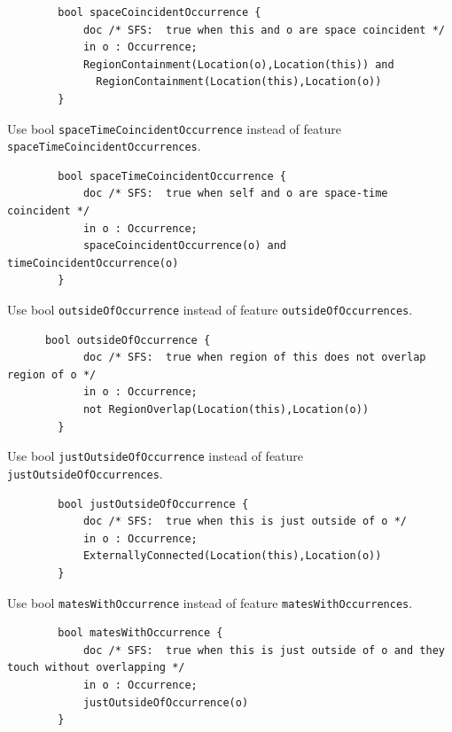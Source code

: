 \begin{lstlisting}
		bool spaceCoincidentOccurrence {
			doc /* SFS:  true when this and o are space coincident */
			in o : Occurrence;
			RegionContainment(Location(o),Location(this)) and
			  RegionContainment(Location(this),Location(o))
		}
\end{lstlisting}

\pn Use bool \texttt{spaceTimeCoincidentOccurrence} instead of feature \texttt{spaceTimeCoincidentOccur\-rences}.

\begin{lstlisting}
		bool spaceTimeCoincidentOccurrence {
			doc /* SFS:  true when self and o are space-time coincident */
			in o : Occurrence;
			spaceCoincidentOccurrence(o) and timeCoincidentOccurrence(o)
		}
\end{lstlisting}

\pn Use bool \texttt{outsideOfOccurrence} instead of feature \texttt{outsideOfOccurrences}.

\begin{lstlisting}
	  bool outsideOfOccurrence {
			doc /* SFS:  true when region of this does not overlap region of o */
			in o : Occurrence;
			not RegionOverlap(Location(this),Location(o))
		}
\end{lstlisting}

\pn Use bool \texttt{justOutsideOfOccurrence} instead of feature \texttt{justOutsideOfOccurrences}.

\begin{lstlisting}
		bool justOutsideOfOccurrence {
			doc /* SFS:  true when this is just outside of o */
			in o : Occurrence;
			ExternallyConnected(Location(this),Location(o))
		}
\end{lstlisting}

\pn Use bool \texttt{matesWithOccurrence} instead of feature \texttt{matesWithOccurrences}.

\begin{lstlisting}
		bool matesWithOccurrence {
			doc /* SFS:  true when this is just outside of o and they touch without overlapping */
			in o : Occurrence;
			justOutsideOfOccurrence(o)
		}
\end{lstlisting}

%

